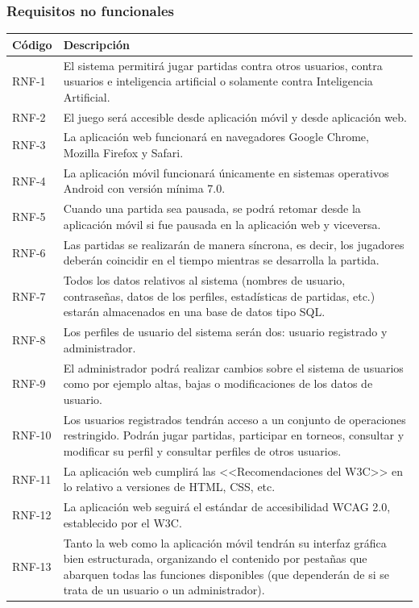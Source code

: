 \documentclass{article}
\begin{document}
\subsubsection{Requisitos no funcionales} %
\begin{center}
    \begin{longtable}{ | p{} | p{} | }
        \hline
        \textbf{Código} & \textbf{Descripción} \\
        \hline
        RNF-1 & El sistema permitirá jugar partidas contra otros usuarios, contra usuarios e inteligencia artificial o solamente contra Inteligencia Artificial. \\
        \hline
        RNF-2 & El juego será accesible desde aplicación móvil y desde aplicación web. \\
        \hline
        RNF-3 & La aplicación web funcionará en navegadores Google Chrome, Mozilla Firefox y Safari. \\
        \hline
        RNF-4 & La aplicación móvil funcionará únicamente en sistemas operativos Android con versión mínima 7.0. \\ %
        \hline
        RNF-5 & Cuando una partida sea pausada, se podrá retomar desde la aplicación móvil si fue pausada en la aplicación web y viceversa. \\
        \hline
        RNF-6 & Las partidas se realizarán de manera síncrona, es decir, los jugadores deberán coincidir en el tiempo mientras se desarrolla la partida. \\
        \hline
        RNF-7 & Todos los datos relativos al sistema (nombres de usuario, contraseñas, datos de los perfiles, estadísticas de partidas, etc.) estarán almacenados en una base de datos tipo SQL. \\
        \hline
        RNF-8 & Los perfiles de usuario del sistema serán dos: usuario registrado y administrador. \\
        \hline
        RNF-9 & El administrador podrá realizar cambios sobre el sistema de usuarios como por ejemplo altas, bajas o modificaciones de los datos de usuario. \\
        \hline
        RNF-10 & Los usuarios registrados tendrán acceso a un conjunto de operaciones restringido. Podrán jugar partidas, participar en torneos, consultar y modificar su perfil y consultar perfiles de otros usuarios. \\
        \hline
        RNF-11 & La aplicación web cumplirá las <<Recomendaciones del W3C>> en lo relativo a versiones de HTML, CSS, etc. \\
        \hline
        RNF-12 & La aplicación web seguirá el estándar de accesibilidad WCAG 2.0, establecido por el W3C. \\
        \hline
        RNF-13 & Tanto la web como la aplicación móvil tendrán su interfaz gráfica bien estructurada, organizando el contenido por pestañas que abarquen todas las funciones disponibles (que dependerán de si se trata de un usuario o un administrador). \\
        \hline
        

\end{longtable}
\end{center}
\end{document}
